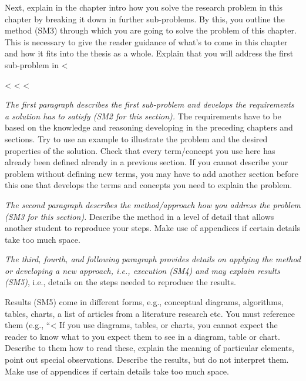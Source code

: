 {{{Next, explain in the chapter intro how you solve the research problem in this chapter by breaking it down in further sub-problems.
By this, you outline the method (SM3) through which you are going to solve the problem of this chapter.
This is necessary to give the reader guidance of what's to come in this chapter and how it fits into the thesis as a whole.
Explain that you will address the first sub-problem in <%

<%
<%
<%

\emph{The first paragraph describes the first sub-problem and develops the requirements a solution has to satisfy (SM2 for this section).}
The requirements have to be based on the knowledge and reasoning developing in the preceding chapters and sections.
Try to use an example to illustrate the problem and the desired properties of the solution.
Check that every term/concept you use here has already been defined already in a previous section.
If you cannot describe your problem without defining new terms, you may have to add another section before this one that develops the terms and concepts you need to explain the problem.

\emph{The second paragraph describes the method/approach how you address the problem (SM3 for this section).}
Describe the method in a level of detail that allows another student to reproduce your steps.
Make use of appendices %
if certain details take too much space.

\emph{The third, fourth, and following paragraph provides details on applying the method or developing a new approach, i.e., execution (SM4) and may explain results (SM5)}, i.e., details on the steps needed to reproduce the results.

Results (SM5) come in different forms, e.g., conceptual diagrams, algorithms, tables, charts, a list of articles from a literature research etc. You must reference them (e.g., ``<%
If you use diagrams, tables, or charts, you cannot expect the reader to know what to you expect them to see in a diagram, table or chart.
Describe to them how to read these, explain the meaning of particular elements, point out special observations.
Describe the results, but do not interpret them.
Make use of appendices if certain details take too much space.

}}}
